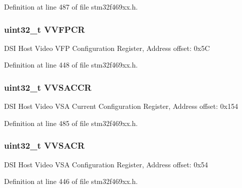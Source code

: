 Definition at line 487 of file stm32f469xx.\+h.

\subsubsection[{\texorpdfstring{V\+V\+F\+P\+CR}{VVFPCR}}]{ uint32\+\_\+t V\+V\+F\+P\+CR}\hypertarget{struct_d_s_i___type_def_a27fc5f60a3c37d104411a90628bc75c3}{}\label{struct_d_s_i___type_def_a27fc5f60a3c37d104411a90628bc75c3}
D\+SI Host Video V\+FP Configuration Register, Address offset\+: 0x5C 

Definition at line 448 of file stm32f469xx.\+h.

\subsubsection[{\texorpdfstring{V\+V\+S\+A\+C\+CR}{VVSACCR}}]{ uint32\+\_\+t V\+V\+S\+A\+C\+CR}\hypertarget{struct_d_s_i___type_def_ae60126856ac70dc332b9859a415b2f06}{}\label{struct_d_s_i___type_def_ae60126856ac70dc332b9859a415b2f06}
D\+SI Host Video V\+SA Current Configuration Register, Address offset\+: 0x154 

Definition at line 485 of file stm32f469xx.\+h.

\subsubsection[{\texorpdfstring{V\+V\+S\+A\+CR}{VVSACR}}]{ uint32\+\_\+t V\+V\+S\+A\+CR}\hypertarget{struct_d_s_i___type_def_a0c20992c8f20f040628e8dd16b67b399}{}\label{struct_d_s_i___type_def_a0c20992c8f20f040628e8dd16b67b399}
D\+SI Host Video V\+SA Configuration Register, Address offset\+: 0x54 

Definition at line 446 of file stm32f469xx.\+h.


